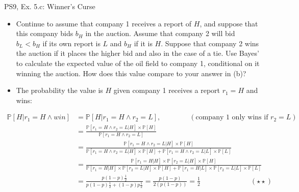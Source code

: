 \begin{frame}{PS9, Ex. 5.c: Winner's Curse}
      \begin{itemize}
        \item[(c)] Continue to assume that company 1 receives a report of $H$, and suppose that this company bids $b_H$ in the auction. Assume that company 2 will bid $b_L < b_H$ if its own report is $L$ and $b_H$ if it is $H$. Suppose that company 2 wins the auction if it places the higher bid and also in the case of a tie. Use Bayes’ to calculate the expected value of the oil field to company 1, conditional on it winning the auction. How does this value compare to your answer in (b)?
        \item[Step 1:] The probability the value is $H$ given company 1 receives a report $r_1=H$ and wins:
        \end{itemize}
        \vspace{-8pt}
        \begin{align*}
            \mathbb{P}[H|r_1=H\wedge win]&=\mathbb{P}[H|r_1=H\wedge r_2=L],\quad\quad\quad\quad(\text{company 1 only wins if }r_2=L)\\
            &=\frac{\mathbb{P}[r_1=H\wedge r_2=L|H]\times\mathbb{P}[H]}{\mathbb{P}[r_1=H\wedge r_2=L]}&\\
            &=\frac{\mathbb{P}[r_1=H\wedge r_2=L|H]\times\mathbb{P}[H]}{\mathbb{P}[r_1=H\wedge r_2=L|H]\times\mathbb{P}[H]+\mathbb{P}[r_1=H\wedge r_2=L|L]\times\mathbb{P}[L]}&\\
            &=\frac{\mathbb{P}[r_1=H|H]\times\mathbb{P}[r_2=L|H]\times\mathbb{P}[H]}{\mathbb{P}[r_1=H|H]\times\mathbb{P}[r_2=L|H]\times\mathbb{P}[H]+\mathbb{P}[r_1=H|L]\times\mathbb{P}[r_2=L|L]\times\mathbb{P}[L]}&\\
            &=\frac{p(1-p)\frac{1}{2}}{p(1-p)\frac{1}{2}+(1-p)p\frac{1}{2}}=\frac{p(1-p)}{2(p(1-p))}=\frac{1}{2}\quad\quad\quad\quad\quad\quad\quad(\star\star)
        \end{align*}
      \vfill\null
\end{frame}
